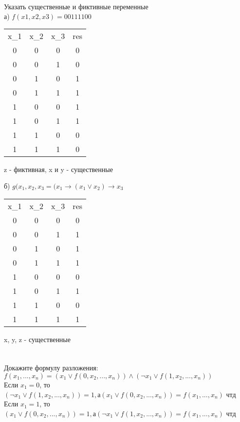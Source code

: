 \documentclass{article}
\begin{document}
\section{}
Указать существенные и фиктивные переменные\\
а) $f(x1, x2, x3)=00111100$
\begin{center}
\begin{tabular}{ |c|c|c|c| } 
 \hline
 x_1 & x_2 & x_3 & res \\
 0 & 0 & 0 & 0 \\ 
 0 & 0 & 1 & 0 \\ 
 0 & 1 & 0 & 1 \\ 
 0 & 1 & 1 & 1 \\ 
 1 & 0 & 0 & 1 \\ 
 1 & 0 & 1 & 1 \\ 
 1 & 1 & 0 & 0 \\
 1 & 1 & 1 & 0 \\
 \hline
\end{tabular}
\end{center}
z - фиктивная, x и y - существенные

б) $g(x_1, x_2, x_3 = (x_1 \rightarrow (x_1 \vee x_2) \rightarrow x_3$
\begin{center}
\begin{tabular}{ |c|c|c|c| } 
 \hline
 x_1 & x_2 & x_3 & res \\
 0 & 0 & 0 & 0 \\ 
 0 & 0 & 1 & 1 \\ 
 0 & 1 & 0 & 1 \\ 
 0 & 1 & 1 & 1 \\ 
 1 & 0 & 0 & 0 \\ 
 1 & 0 & 1 & 1 \\ 
 1 & 1 & 0 & 0 \\
 1 & 1 & 1 & 1 \\
 \hline
\end{tabular}
\end{center}
x, y, z - существенные\\
\section{}
Докажите формулу разложения:\\
$f(x_1,...,x_n)=(x_1 \vee f(0, x_2, ..., x_n)) \wedge (\neg x_1 \vee f(1, x_2, ..., x_n))$
\\
Если $x_1=0$, то $(\neg x_1 \vee f(1, x_2, ..., x_n))=1, а (x_1 \vee f(0, x_2, ..., x_n))=f(x_1,...,x_n)$ чтд\\
Если $x_1=1$, то $(x_1 \vee f(0, x_2, ..., x_n))=1, а (\neg x_1 \vee f(1, x_2, ..., x_n))=f(x_1,...,x_n)$  чтд\\
\end{document}
